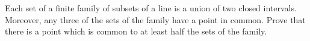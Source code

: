 Each set of a finite family of subsets of a line is a union of two closed intervals. Moreover, any three of the sets of the family have a point in common. Prove that there is a point which is common to at least half the sets of the family.